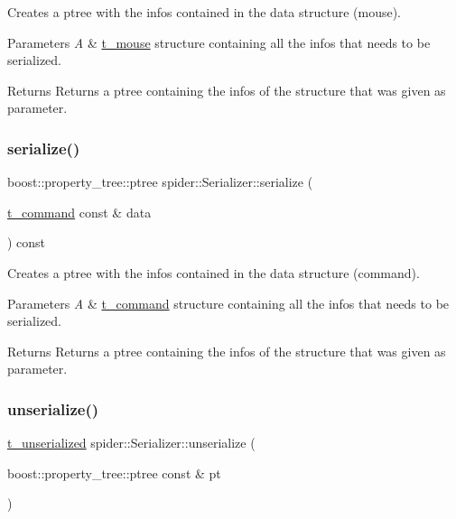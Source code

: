 Creates a ptree with the infos contained in the data structure (mouse). 


\begin{DoxyParams}{Parameters}
{\em A} & \hyperlink{structt__mouse}{t\+\_\+mouse} structure containing all the infos that needs to be serialized. \\
\hline
\end{DoxyParams}
\begin{DoxyReturn}{Returns}
Returns a ptree containing the infos of the structure that was given as parameter. 
\end{DoxyReturn}
\mbox{\label{classspider_1_1_serializer_a939015316b28fb2ed6021bf6f4ee81df}} 
\subsubsection{\texorpdfstring{serialize()}{serialize()}\hspace{0.1cm}{\footnotesize\ttfamily [4/4]}}
{\footnotesize\ttfamily boost\+::property\+\_\+tree\+::ptree spider\+::\+Serializer\+::serialize (\begin{DoxyParamCaption}\item[{\hyperlink{structt__command}{t\+\_\+command} const \&}]{data }\end{DoxyParamCaption}) const}



Creates a ptree with the infos contained in the data structure (command). 


\begin{DoxyParams}{Parameters}
{\em A} & \hyperlink{structt__command}{t\+\_\+command} structure containing all the infos that needs to be serialized. \\
\hline
\end{DoxyParams}
\begin{DoxyReturn}{Returns}
Returns a ptree containing the infos of the structure that was given as parameter. 
\end{DoxyReturn}
\mbox{\label{classspider_1_1_serializer_af3bdf08f49c4c9f6111b392264256b7b}} 
\subsubsection{\texorpdfstring{unserialize()}{unserialize()}}
{\footnotesize\ttfamily \hyperlink{structt__unserialized}{t\+\_\+unserialized} spider\+::\+Serializer\+::unserialize (\begin{DoxyParamCaption}\item[{boost\+::property\+\_\+tree\+::ptree const \&}]{pt }\end{DoxyParamCaption})}



